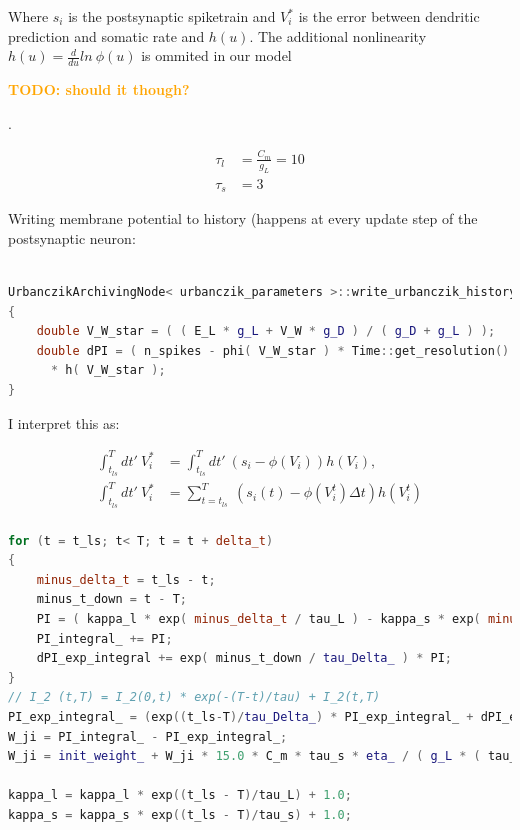 \documentclass[12pt,a4paper,titlepage]{report}
\newcommand{\todo}[1] {\textcolor{orange}{\textbf{TODO: #1} \addcontentsline{toc}{subsection}{\textcolor{orange}{TODO: #1}}
}}
\begin{document}
Where $s_i$ is the postsynaptic spiketrain and $V_i^*$ is the error between dendritic prediction and somatic rate and $h( u )$. The additional nonlinearity $h( u ) = \frac{d}{du} ln \  \phi(u)$ is ommited in our model \todo{should it though?}.



\begin{align}
  \tau_l & = \frac{C_m}{g_L} = 10 \\
  \tau_s & = 3
\end{align}

Writing membrane potential to history (happens at every update step of the postsynaptic neuron:

\begin{lstlisting}[language=C++, directivestyle={\color{black}}
                   emph={int,char,double,float,unsigned,exp},
                   emphstyle={\color{blue}}]

UrbanczikArchivingNode< urbanczik_parameters >::write_urbanczik_history(Time t, double V_W, int n_spikes, int comp)
{
	double V_W_star = ( ( E_L * g_L + V_W * g_D ) / ( g_D + g_L ) );
	double dPI = ( n_spikes - phi( V_W_star ) * Time::get_resolution().get_ms() )
      * h( V_W_star );
}\end{lstlisting}

I interpret this as:


\begin{align*}
  \int_{t_{ls}}^T dt' \ V_i^* & = \int_{t_{ls}}^T dt' \  (s_i - \phi(V_i )) h(V_i),               \\
  \int_{t_{ls}}^T dt' \ V_i^* & = \sum_{t=t_{ls}}^T \  (s_i(t) -  \phi(V_i^t ) \Delta t) h(V_i^t) \\
\end{align*}

\begin{lstlisting}[language=C++, directivestyle={\color{black}}
                   emph={int,char,double,float,unsigned,exp},
                   emphstyle={\color{blue}}]
for (t = t_ls; t< T; t = t + delta_t)
{
   	minus_delta_t = t_ls - t;
    minus_t_down = t - T;
    PI = ( kappa_l * exp( minus_delta_t / tau_L ) - kappa_s * exp( minus_delta_t / tau_s ) ) * V_star(t);
    PI_integral_ += PI;
    dPI_exp_integral += exp( minus_t_down / tau_Delta_ ) * PI;
}  
// I_2 (t,T) = I_2(0,t) * exp(-(T-t)/tau) + I_2(t,T)
PI_exp_integral_ = (exp((t_ls-T)/tau_Delta_) * PI_exp_integral_ + dPI_exp_integral);
W_ji = PI_integral_ - PI_exp_integral_;
W_ji = init_weight_ + W_ji * 15.0 * C_m * tau_s * eta_ / ( g_L * ( tau_L - tau_s ) );    
  
kappa_l = kappa_l * exp((t_ls - T)/tau_L) + 1.0;
kappa_s = kappa_s * exp((t_ls - T)/tau_s) + 1.0;
  \end{lstlisting}
\end{document}
